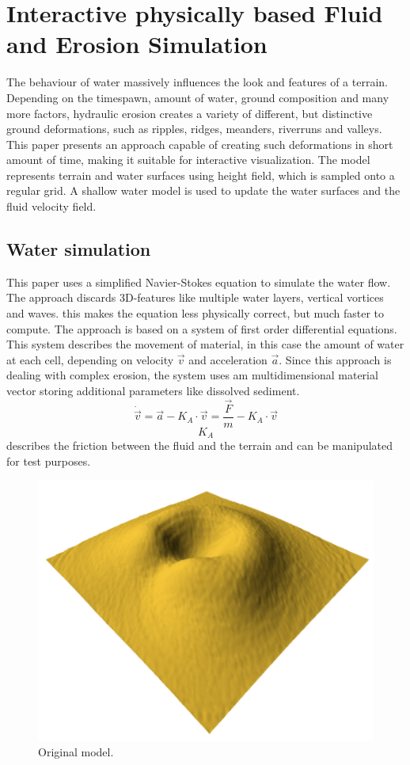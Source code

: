 \section{Interactive physically based Fluid and Erosion Simulation}

The behaviour of water massively influences the look and features of a terrain. Depending on the timespawn, amount of water, ground composition and many more factors, hydraulic erosion creates a variety of different, but distinctive ground deformations, such as ripples, ridges, meanders, riverruns and valleys. 
This paper \cite{Neidhold:2005:IPB:2381356.2381361} presents an approach capable of creating such deformations in short amount of time, making it suitable for interactive visualization. The model represents terrain and water surfaces using height field, which is sampled onto a regular grid. A shallow water model is used to update the water surfaces and the fluid velocity field. 

\subsection{Water simulation}
This paper uses a simplified Navier-Stokes equation to simulate the water flow. The approach discards 3D-features like multiple water layers, vertical vortices and waves. this makes the equation less physically correct, but much faster to compute. The approach is based on a system of first order differential equations. This system describes the movement of material, in this case the amount of water at each cell, depending on velocity $\vec{v}$ and acceleration $\vec{a}$. Since this approach is dealing with complex erosion, the system uses am multidimensional material vector storing additional parameters like dissolved sediment.
$$\dot{\vec{v}} = \vec{a} -K_A \cdot \vec{v}=\frac{\vec{F}}{m} - K_A\cdot \vec{v}$$
$$K_A$$ describes the friction between the fluid and the terrain and can be manipulated for test purposes. 

\begin{figure}
	\centering
	\includegraphics[width=\linewidth]{NWD05/hydraulic_errosion_a}
	\caption{Original model.}
	\label{fig:calc_acceleration}
\end{figure}

